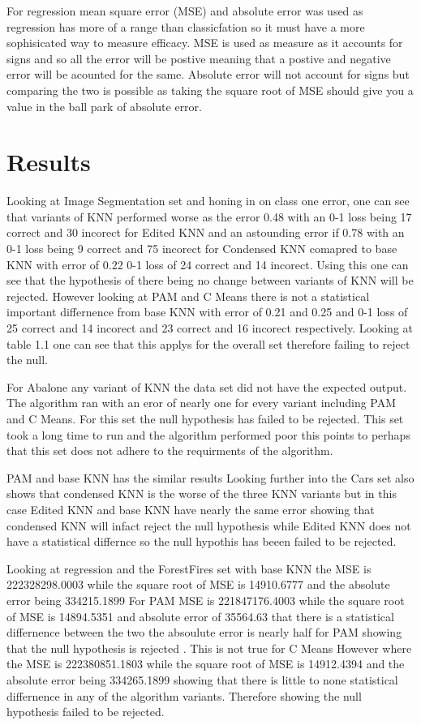 \documentclass[twoside,11pt]{article}
\begin{document}
For regression mean square error (MSE) and absolute error was used as regression has more of a range than classicfation so it must 
have a more sophisicated way to measure efficacy. MSE is used as measure as it accounts for signs and so all the error will be postive
meaning that a postive and negative error will be acounted for the same. Absolute error will not account for signs but comparing the two
is possible as taking the square root of MSE should give you a value in the ball park of absolute error. 



\section{Results}
Looking at Image Segmentation set and honing in on class one error, one can see that variants of KNN performed worse as the error 0.48 with an 0-1 loss being 
17 correct and 30 incorect for Edited KNN and an astounding error if 0.78 with an 0-1 loss being 9 correct and 75 incorect for Condensed KNN 
comapred to base KNN with error of 0.22 0-1 loss of 24 correct and 14 incorect.  Using this one can see that the hypothesis of there being no change 
between variants of KNN will be rejected.  However looking at PAM and C Means there is not a statistical important differnence from base KNN with error
of 0.21 and 0.25 and 0-1 loss of 25 correct and 14 incorect and 23 correct and 16 incorect respectively. Looking at table 1.1 one can see that this applys
for the overall set therefore failing to reject the null.

For Abalone any variant of KNN the data set did not have the expected output.  The algorithm ran with an eror of nearly one for every variant including PAM and C Means. For this set 
the null hypothesis has failed to be rejected. This set took a long time to run and the algorithm performed poor this points to perhaps that this set 
does not adhere to the requirments of the algorithm. 

PAM and base KNN has the similar results Looking further into the Cars set also shows that condensed KNN is the worse of the three KNN variants but 
in this case Edited KNN and base KNN  have nearly the same error showing that condensed KNN will infact reject the null hypothesis while 
Edited KNN does not have a statistical differnce so the null hypothis has beeen failed to be rejected.  

Looking at regression and the ForestFires set with base KNN the MSE is 222328298.0003 while the square root of MSE is 14910.6777
and the absolute error being 334215.1899 For PAM MSE is 221847176.4003 while the square root of MSE is 14894.5351 and absolute error of 
35564.63 that there is a statistical differnence between the two the absoulute error is nearly half for PAM showing that the null hypothesis is rejected .  
This is not true for C Means However where the MSE is 222380851.1803 while the square root of MSE is 14912.4394 and the 
absolute error being 334265.1899 showing that there is little to none statistical differnence in any of the algorithm variants. Therefore 
showing the null hypothesis failed to be rejected. 
\end{document}
